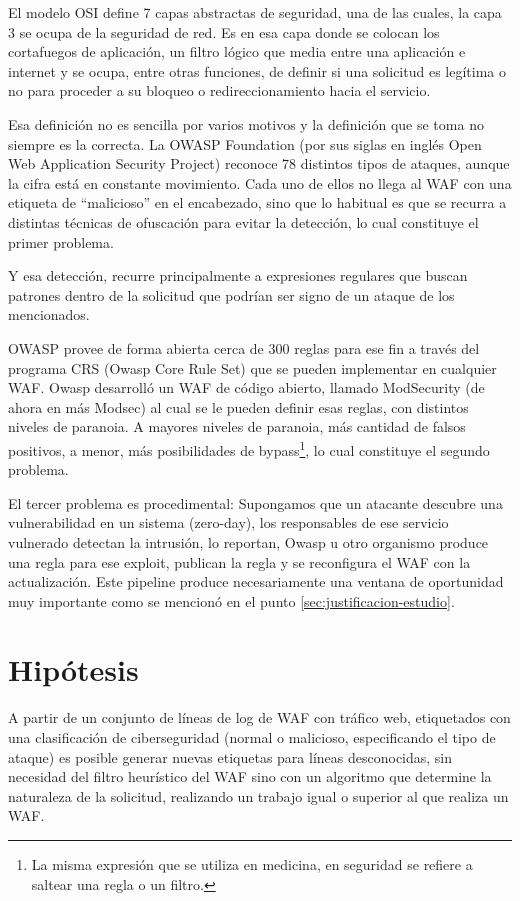 \documentclass[12pt]{article}
\begin{document}
El modelo OSI define 7 capas abstractas de seguridad, una de las cuales, la capa 3 se ocupa de la seguridad de red.
Es en esa capa donde se colocan los cortafuegos de aplicación, un filtro lógico que media entre una aplicación e internet y se ocupa, entre otras funciones, de definir si una solicitud es legítima o no para proceder a su bloqueo o redireccionamiento hacia el servicio.

Esa definición no es sencilla por varios motivos y la definición que se toma no siempre es la correcta. La OWASP Foundation (por sus siglas en inglés Open Web Application Security Project) reconoce 78 distintos tipos de ataques, aunque la cifra está en constante movimiento. Cada uno de ellos no llega al WAF con una etiqueta de \enquote{malicioso} en el encabezado, sino que lo habitual es que se recurra a distintas técnicas de ofuscación para evitar la detección, lo cual constituye el primer problema.

Y esa detección, recurre principalmente a expresiones regulares que buscan patrones dentro de la solicitud que podrían ser signo de un ataque de los mencionados.

 OWASP provee de forma abierta cerca de 300 reglas para ese fin a través del programa CRS (Owasp Core Rule Set) que se pueden implementar en cualquier WAF. Owasp desarrolló un WAF de código abierto, llamado ModSecurity (de ahora en más Modsec) al cual se le pueden definir esas reglas, con distintos niveles de paranoia. A mayores niveles de paranoia, más cantidad de falsos positivos, a menor, más posibilidades de bypass\footnote{La misma expresión que se utiliza en medicina, en seguridad se refiere a saltear una regla o un filtro.}, lo cual constituye el segundo problema.

El tercer problema es procedimental: Supongamos que un atacante descubre una vulnerabilidad en un sistema (zero-day), los responsables de ese servicio vulnerado detectan la intrusión, lo reportan, Owasp u otro organismo produce una regla para ese exploit, publican la regla y se reconfigura el WAF con la actualización. Este pipeline produce necesariamente una ventana de oportunidad muy importante como se mencionó en el punto \ref{sec:justificacion-estudio}.

\section{Hipótesis}
A partir de un conjunto de líneas de log de WAF con tráfico web, etiquetados con una clasificación de ciberseguridad (normal o malicioso, especificando el tipo de ataque) es posible generar nuevas etiquetas para líneas desconocidas, sin necesidad del filtro heurístico del WAF sino con un algoritmo que determine la naturaleza de la solicitud, realizando un trabajo igual o superior al que realiza un WAF.
\end{document}
